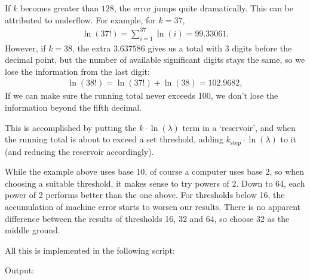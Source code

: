 If $k$ becomes greater than $128$, the error jumps quite dramatically.
This can be attributed to underflow.
For example, for $k=37$,
\begin{equation}
\begin{split}
\ln(37!) = \sum^{37}_{i=1} \ln(i) = \mathtt{99.33061}.
\end{split}
\end{equation}
However, if $k=38$, the extra $\mathtt{3.637586}$ gives us a total with 3 digits before the decimal point,
but the number of available significant digits stays the same, so we lose the information from the last digit:
\begin{equation}
\begin{split}
\ln(38!) = \ln(37!) + \ln(38) = \mathtt{102.9682},
\end{split}
\end{equation}
If we can make sure the running total never exceeds 100, we don't lose the information beyond the fifth decimal.

This is accomplished by putting the $k \cdot \ln(\lambda)$ term in a `reservoir',  and when the running total is about to exceed a set threshold, adding $k_\mathrm{step} \cdot \ln(\lambda)$ to it (and reducing the reservoir accordingly).

While the example above uses base 10, of course a computer uses base 2, 
so when choosing a suitable threshold, it makes sense to try powers of 2. 
Down to 64, each power of 2 performs better than the one above.
For thresholds below 16, the accumulation of machine error starts to worsen our results.
There is no apparent difference between the results of thresholds 16, 32 and 64, so choose 32 as the middle ground.





All this is implemented in the following script:


Output:



